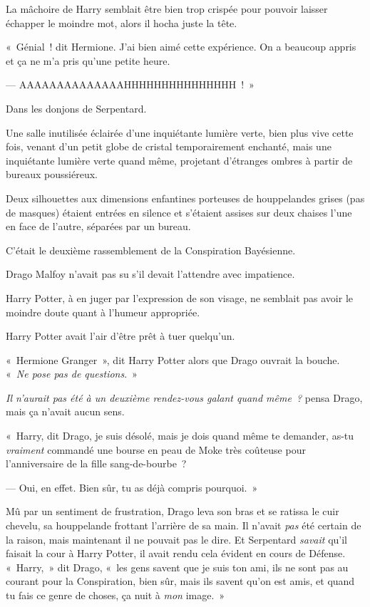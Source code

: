 La mâchoire de Harry semblait être bien trop crispée pour pouvoir laisser échapper le moindre mot, alors il hocha juste la tête.

«~Génial~! dit Hermione. J'ai bien aimé cette expérience. On a beaucoup appris et ça ne m'a pris qu'une petite heure.

--- AAAAAAAAAAAAAAHHHHHHHHHHHHHHH~!~»

\later

Dans les donjons de Serpentard.

Une salle inutilisée éclairée d'une inquiétante lumière verte, bien plus vive cette fois, venant d'un petit globe de cristal temporairement enchanté, mais une inquiétante lumière verte quand même, projetant d'étranges ombres à partir de bureaux poussiéreux.

Deux silhouettes aux dimensions enfantines porteuses de houppelandes grises (pas de masques) étaient entrées en silence et s'étaient assises sur deux chaises l'une en face de l'autre, séparées par un bureau.

C'était le deuxième rassemblement de la Conspiration Bayésienne.

Drago Malfoy n'avait pas su s'il devait l'attendre avec impatience.

Harry Potter, à en juger par l'expression de son visage, ne semblait pas avoir le moindre doute quant à l'humeur appropriée.

Harry Potter avait l'air d'être prêt à tuer quelqu'un.

«~Hermione Granger~», dit Harry Potter alors que Drago ouvrait la bouche. «~\emph{Ne pose pas de questions}.~»

\emph{Il n'aurait pas été à un deuxième rendez-vous galant quand même~?} pensa Drago, mais ça n'avait aucun sens.

«~Harry, dit Drago, je suis désolé, mais je dois quand même te demander, as-tu \emph{vraiment} commandé une bourse en peau de Moke très coûteuse pour l'anniversaire de la fille sang-de-bourbe~?

--- Oui, en effet. Bien sûr, tu as déjà compris pourquoi.~»

Mû par un sentiment de frustration, Drago leva son bras et se ratissa le cuir chevelu, sa houppelande frottant l'arrière de sa main. Il n'avait \emph{pas} été certain de la raison, mais maintenant il ne pouvait pas le dire. Et Serpentard \emph{savait} qu'il faisait la cour à Harry Potter, il avait rendu cela évident en cours de Défense. «~Harry,~» dit Drago, «~les gens savent que je suis ton ami, ils ne sont pas au courant pour la Conspiration, bien sûr, mais ils savent qu'on est amis, et quand tu fais ce genre de choses, ça nuit à \emph{mon} image.~»

